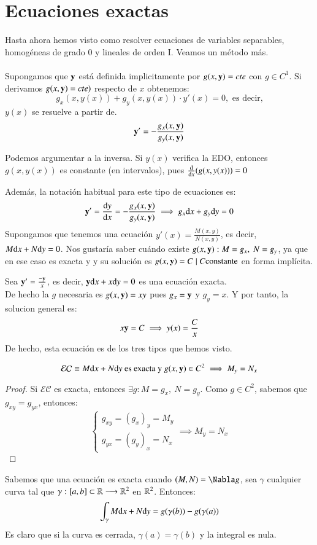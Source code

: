 \section{Ecuaciones exactas}
Hasta ahora hemos visto como resolver ecuaciones de variables separables, homogéneas de grado 0 y lineales de orden I. Veamos un método más.\\\\
Supongamos que $\mathbf{y}$ está definida implicitamente por $g(x, \mathbf{y}) = cte$ con $g \in C^1$. Si derivamos $g(x, \mathbf{y}) = cte)$ respecto de $x$ obtenemos:
$$
    g_x(x, y(x)) + g_y(x, y(x)) \cdot y'(x) = 0, \text{ es decir,}
$$
$y(x)$ se resuelve a partir de.
$$
    \mathbf{y'} = -\frac{g_x(x,\mathbf{y})}{g_y(x,\mathbf{y})}
$$
\begin{obs}
    Podemos argumentar a la inversa. Si $y(x)$ verifica la EDO, entonces $g(x, y(x))$ es constante (en intervalos), pues $\frac{\mathrm{d}}{\mathrm{d}x}(g(x, y(x))) = 0$
\end{obs}
Además, la notación habitual para este tipo de ecuaciones es:
$$
    \mathbf{y'} = \frac{\mathrm{d}y}{\mathrm{d}x} = -\frac{g_x(x,\mathbf{y})}{g_y(x,\mathbf{y})} \implies g_x\mathrm{d} x + g_y \mathrm{d} y = 0
$$
Supongamos que tenemos una ecuación $y'(x) = \frac{M(x,y)}{N(x,y)}$, es decir, $M\mathrm{d} x + N \mathrm{d} y = 0$. Nos gustaría saber cuándo existe $g(x, \mathbf{y}) : M = g_x,\ N = g_y$, ya que en ese caso es exacta y y su solución es $g(x, \mathbf{y}) = C \mid C \text{constante}$ en forma implícita.
\begin{eg}
    Sea $\mathbf{y'} = \frac{-\mathbf{y}}{x}$, es decir, $\mathbf{y}\mathrm{d} x + x \mathrm{d} y = 0$ es una ecuación exacta.\\
    De hecho la $g$ necesaria es $g(x,\mathbf{y}) = xy$ pues $g_x = \mathbf{y}$ y $g_y = x$. Y por tanto, la solucion general es:
    $$
        x\mathbf{y} = C \implies y(x) = \frac{C}{x}
    $$
    De hecho, esta ecuación es de los tres tipos que hemos visto.
\end{eg}
\begin{pro}
    $$
        \mathcal{EC} \equiv M\mathrm{d} x + N\mathrm{d} y \text{ es exacta y }g(x, \mathbf{y}) \in C^2 \implies M_y = N_x
    $$
\end{pro}
\begin{proof}
    Si $\mathcal{EC}$ es exacta, entonces $\exists g : M = g_x,\ N = g_y$. Como $g \in C^2$, sabemos que $g_{xy} = g_{yx}$, entonces:
    $$
        \begin{cases}
            g_{xy} = (g_x)_y = M_y\\
            g_{yx} = (g_y)_x = N_x
        \end{cases} \implies M_y = N_x
    $$
\end{proof}
\begin{obs}
    Sabemos que una ecuación es exacta cuando $(M, N) = \Nabla g$, sea $\gamma$ cualquier curva tal que $\gamma : [a,b]\subset\mathbb{R} \longrightarrow \mathbb{R}^2$ en $\mathbb{R}^2$. Entonces:
    $$
        \int_\gamma M\mathrm{d} x + N\mathrm{d} y = g(\gamma(b)) - g(\gamma(a))
    $$
    Es claro que si la curva es cerrada, $\gamma(a)=\gamma(b)$ y la integral es nula.
\end{obs}

